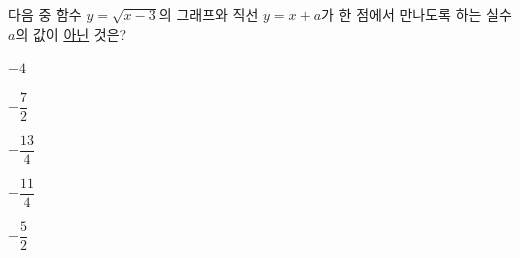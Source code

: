 \hspace*{2mm}\begin{minipage}[t]{\dimexpr\linewidth-2mm\relax}\vspace{0pt}
다음 중 함수 $y=\sqrt{x-3}$의 그래프와 직선 $y=x+a$가 한 점에서 만나도록 하는 실수 $a$의 값이 \underline{아닌} 것은?
\begin{choices32}{\rule[-3ex]{0pt}{8ex}$-4$}{\rule[-3ex]{0pt}{8ex}$-\dfrac{7}{2}$}{\rule[-3ex]{0pt}{8ex}$-\dfrac{13}{4}$}{\rule[-3ex]{0pt}{8ex}$-\dfrac{11}{4}$}{\rule[-3ex]{0pt}{8ex}$-\dfrac{5}{2}$}\end{choices32}\end{minipage}
